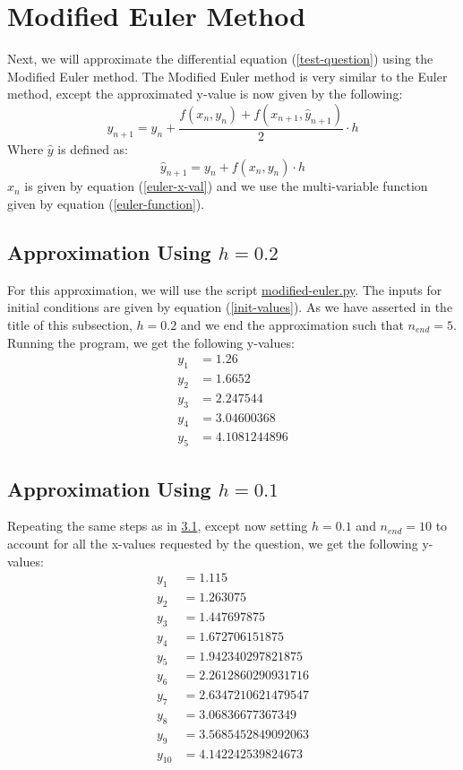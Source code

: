 \documentclass{article}
\begin{document}
\section{Modified Euler Method}
Next, we will approximate the differential equation (\ref{test-question}) using the Modified Euler method. The Modified Euler method is very similar to the Euler method, except the approximated y-value is now given by the following:
\begin{equation} \label{improved-euler}
    y_{n+1}=y_n+\frac{f(x_n,y_n) + f(x_{n+1}, \hat{y}_{n+1})}{2} \cdot h
\end{equation}
Where $\hat{y}$ is defined as:
\begin{equation}
    \hat{y}_{n+1}=y_n + f(x_n, y_n) \cdot h
\end{equation}
$x_n$ is given by equation (\ref{euler-x-val}) and we use the multi-variable function given by equation (\ref{euler-function}).
\subsection{Approximation Using $h=0.2$}
\label{sec:3.1}
For this approximation, we will use the script \href{https://github.com/colinmc513/approximation-scripts/blob/main/modified-euler.py}{modified-euler.py}. The inputs for initial conditions are given by equation (\ref{init-values}). As we have asserted in the title of this subsection, $h=0.2$ and we end the approximation such that $n_{end}=5$. Running the program, we get the following y-values:
\begin{equation*}
    \begin{split}
        y_1 &= 1.26 \\
        y_2 &= 1.6652 \\
        y_3 &= 2.247544 \\
        y_4 &= 3.04600368 \\
        y_5 &= 4.1081244896 
    \end{split}
\end{equation*}
\subsection{Approximation Using $h=0.1$}
Repeating the same steps as in \hyperref[sec:3.1]{3.1}, except now setting $h = 0.1$ and $n_{end}=10$ to account for all the x-values requested by the question, we get the following y-values:
\begin{equation*}
    \begin{split}
        y_1 &= 1.115 \\
        y_2 &= 1.263075 \\
        y_3 &= 1.447697875 \\
        y_4 &= 1.672706151875 \\
        y_5 &= 1.942340297821875 \\
        y_6 &= 2.2612860290931716 \\
        y_7 &= 2.6347210621479547 \\
        y_8 &= 3.06836677367349 \\
        y_9 &= 3.5685452849092063 \\
        y_{10} &= 4.142242539824673 
    \end{split}
\end{equation*}
\end{document}
